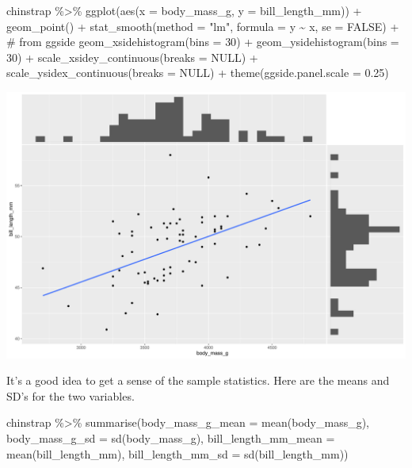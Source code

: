 \documentclass[
  letterpaper,
  DIV=11,
  numbers=noendperiod]{scrartcl}
\newenvironment{Shaded}{\begin{snugshade}}{\end{snugshade}}
\newcommand{\AttributeTok}[1]{\textcolor[rgb]{0.40,0.45,0.13}{#1}}
\newcommand{\CommentTok}[1]{\textcolor[rgb]{0.37,0.37,0.37}{#1}}
\newcommand{\ConstantTok}[1]{\textcolor[rgb]{0.56,0.35,0.01}{#1}}
\newcommand{\DecValTok}[1]{\textcolor[rgb]{0.68,0.00,0.00}{#1}}
\newcommand{\FloatTok}[1]{\textcolor[rgb]{0.68,0.00,0.00}{#1}}
\newcommand{\FunctionTok}[1]{\textcolor[rgb]{0.28,0.35,0.67}{#1}}
\newcommand{\NormalTok}[1]{\textcolor[rgb]{0.00,0.23,0.31}{#1}}
\newcommand{\SpecialCharTok}[1]{\textcolor[rgb]{0.37,0.37,0.37}{#1}}
\newcommand{\StringTok}[1]{\textcolor[rgb]{0.13,0.47,0.30}{#1}}
\begin{document}
\begin{Shaded}
\begin{Highlighting}[]
\NormalTok{chinstrap }\SpecialCharTok{\%\textgreater{}\%} 
  \FunctionTok{ggplot}\NormalTok{(}\FunctionTok{aes}\NormalTok{(}\AttributeTok{x =}\NormalTok{ body\_mass\_g, }\AttributeTok{y =}\NormalTok{ bill\_length\_mm)) }\SpecialCharTok{+}
  \FunctionTok{geom\_point}\NormalTok{() }\SpecialCharTok{+}
  \FunctionTok{stat\_smooth}\NormalTok{(}\AttributeTok{method =} \StringTok{"lm"}\NormalTok{, }\AttributeTok{formula =} \StringTok{\textquotesingle{}y \textasciitilde{} x\textquotesingle{}}\NormalTok{, }\AttributeTok{se =} \ConstantTok{FALSE}\NormalTok{) }\SpecialCharTok{+}
  \CommentTok{\# from ggside}
  \FunctionTok{geom\_xsidehistogram}\NormalTok{(}\AttributeTok{bins =} \DecValTok{30}\NormalTok{) }\SpecialCharTok{+}
  \FunctionTok{geom\_ysidehistogram}\NormalTok{(}\AttributeTok{bins =} \DecValTok{30}\NormalTok{) }\SpecialCharTok{+}
  \FunctionTok{scale\_xsidey\_continuous}\NormalTok{(}\AttributeTok{breaks =} \ConstantTok{NULL}\NormalTok{) }\SpecialCharTok{+}
  \FunctionTok{scale\_ysidex\_continuous}\NormalTok{(}\AttributeTok{breaks =} \ConstantTok{NULL}\NormalTok{) }\SpecialCharTok{+}
  \FunctionTok{theme}\NormalTok{(}\AttributeTok{ggside.panel.scale =} \FloatTok{0.25}\NormalTok{)}
\end{Highlighting}
\end{Shaded}

\includegraphics{Bayes_Lab_1_files/figure-pdf/unnamed-chunk-6-1.pdf}

It's a good idea to get a sense of the sample statistics. Here are the
means and SD's for the two variables.

\begin{Shaded}
\begin{Highlighting}[]
\NormalTok{chinstrap }\SpecialCharTok{\%\textgreater{}\%} 
  \FunctionTok{summarise}\NormalTok{(}\AttributeTok{body\_mass\_g\_mean =} \FunctionTok{mean}\NormalTok{(body\_mass\_g),}
            \AttributeTok{body\_mass\_g\_sd =} \FunctionTok{sd}\NormalTok{(body\_mass\_g),}
            \AttributeTok{bill\_length\_mm\_mean =} \FunctionTok{mean}\NormalTok{(bill\_length\_mm),}
            \AttributeTok{bill\_length\_mm\_sd =} \FunctionTok{sd}\NormalTok{(bill\_length\_mm)) }
\end{Highlighting}
\end{Shaded}
\end{document}
